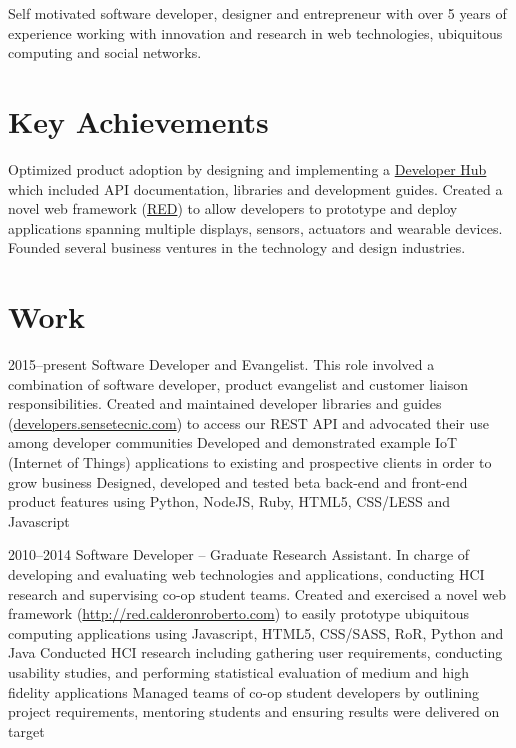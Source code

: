 \documentclass[full]{rvca}
\begin{document}

\begin{statement}
Self motivated software developer, designer and entrepreneur with over 5 years of experience working with innovation and research in web technologies, ubiquitous computing and social networks.
\end{statement}

\section{Key Achievements}

\achievements
{Optimized product adoption by designing and implementing a \href{http://developers.sensetecnic.com/}{Developer Hub} which included API documentation, libraries and development guides.}
{Created a novel web framework (\href{http://red.calderonroberto.com}{RED}) to allow developers 
to prototype and deploy applications spanning multiple displays, sensors, actuators and wearable devices.}
{Founded several business ventures in the technology and design industries.}
{}

\section{Work}


{2015--present}%
{Software Developer and Evangelist.} %
{This role involved a combination of software developer, product evangelist and customer liaison responsibilities.}%
{Created and maintained developer libraries and guides (\href{http://developers.sensetecnic.com}{developers.sensetecnic.com}) to access our REST API and advocated their use among developer communities}
{Developed and demonstrated example IoT (Internet of Things) applications to existing and prospective clients in order to grow business}
{Designed, developed and tested beta back-end and front-end product features using Python, NodeJS, Ruby, HTML5, CSS/LESS and Javascript}
{}
{}

{2010--2014}%
{Software Developer -- Graduate Research Assistant.} %
{In charge of developing and evaluating web technologies and applications, conducting HCI research and supervising co-op student teams.} %
{Created and exercised a novel web framework (\href{http://red.calderonroberto.com}{http://red.calderonroberto.com}) to easily prototype ubiquitous computing applications  using Javascript, HTML5, CSS/SASS, RoR, Python and Java}
{Conducted HCI research including gathering user requirements, conducting usability studies, and performing statistical evaluation of medium and high fidelity applications}
{Managed teams of co-op student developers by outlining project requirements, mentoring students and ensuring results were delivered on target}
{}
{}
\end{document}
